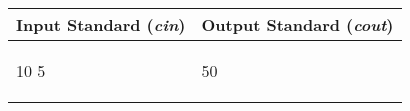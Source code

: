\documentclass[12pt,a4paper]{article}
\begin{document}
\begin{tabular}{|@{}p{}@{}|@{}p{}@{}|}
\hline
\multicolumn{1}{|c|}{\bfseries Input Standard (\textit{cin})} &
\multicolumn{1}{c|}{\bfseries Output Standard (\textit{cout})} \\
\hline
\begin{textQuoteCell}
10 5
\end{textQuoteCell} &
\begin{textQuoteCell}
50
\end{textQuoteCell} \\    
\hline
\end{tabular}
\vspace{1em}


\end{document}
